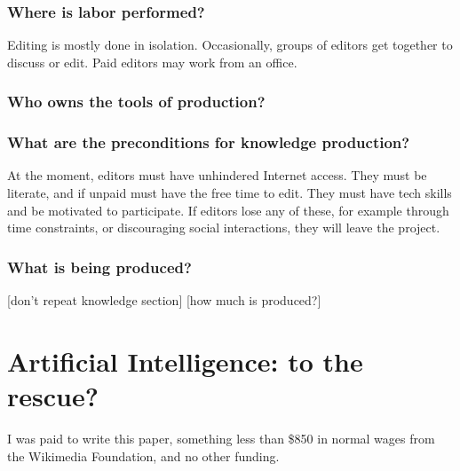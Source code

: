 \documentclass[format=sigconf, authorversion]{acmart}
\begin{document}
\subsubsection{Where is labor performed?}

Editing is mostly done in isolation.  Occasionally, groups of editors get together to discuss or edit.  Paid editors may work from an office.

\subsubsection{Who owns the tools of production?}



\subsubsection{What are the preconditions for knowledge production?}

At the moment, editors must have unhindered Internet access.  They must be literate, and if unpaid must have the free time to edit.  They must have tech skills and be motivated to participate.  If editors lose any of these, for example through time constraints, or discouraging social interactions, they will leave the project.

\subsubsection{What is being produced?}

[don't repeat knowledge section]
[how much is produced?]

\section{Artificial Intelligence: to the rescue?}



\begin{acks}
I was paid to write this paper, something less than \$850 in normal wages from the Wikimedia Foundation, and no other funding.
\end{acks}



\glsaddall
\printglossary[nonumberlist]
\end{document}
